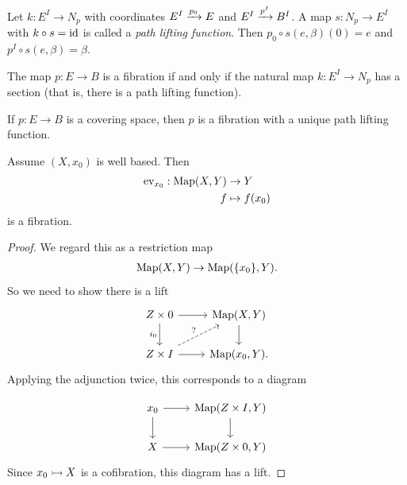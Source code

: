 \documentclass{article}[11pt]
\begin{document}
\begin{definition} Let $k: E^I \to N_p$ with coordinates $E^I\xrightarrow{p_0} E$ and $E^I\xrightarrow{p^I} B^I$. A map $s: N_p \to E^I$ with $k\circ s = \text{id}$ is called a \textit{path lifting function}. Then $p_0 \circ s(e,\beta)(0)=e$ and $p^I\circ s(e,\beta) = \beta$.
\end{definition}

\begin{proposition} The map $p: E \to B$ is a fibration if and only if the natural map $k: E^I \to N_p$ has a section (that is, there is a path lifting function).
\end{proposition}

\begin{remark} If $p: E\to B$ is a covering space, then $p$ is a fibration with a unique path lifting function.
\end{remark}

\begin{example} Assume $(X,x_0)$ is well based. Then
\begin{align*}
	\text{ev}_{x_0} : \textup{Map}(X,Y) &\to Y \\
	f &\mapsto f(x_0)
\end{align*}
is a fibration.
\end{example}
\begin{proof} We regard this as a restriction map
\begin{align*}
	\textup{Map}(X,Y) \to \textup{Map}(\{x_0\},Y).
\end{align*}
So we need to show there is a lift
\[
	\begin{tikzcd}
	Z\times 0 \rar\dar["i_0" left] & \Map(X,Y)\dar \\
	Z\times I\ar[ur,dashed,"?"]\rar & \Map(x_0,Y).
	\end{tikzcd}
\]
Applying the adjunction twice, this corresponds to a diagram

\[
	\begin{tikzcd}
	x_0\dar\rar & \Map(Z\times I, Y) \dar\\
	X\rar & \Map (Z\times 0, Y)
	\end{tikzcd}
\]
Since $x_0 \rightarrowtail X$ is a cofibration, this diagram has a lift.


\end{proof}
\end{document}
